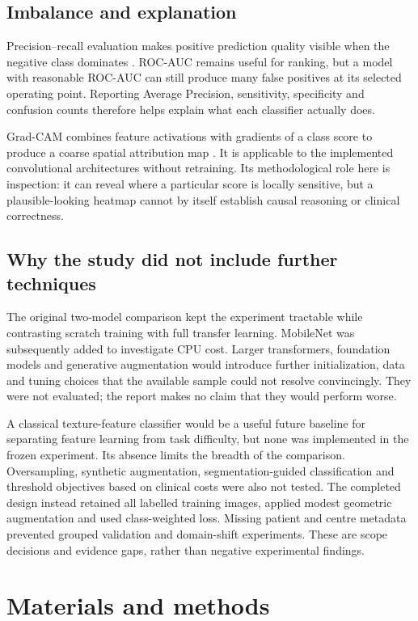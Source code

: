 \documentclass[11pt,a4paper]{article}
\begin{document}
\subsection{Imbalance and explanation}
Precision--recall evaluation makes positive prediction quality visible when the negative class dominates \citep{saito2015}. ROC-AUC remains useful for ranking, but a model with reasonable ROC-AUC can still produce many false positives at its selected operating point. Reporting Average Precision, sensitivity, specificity and confusion counts therefore helps explain what each classifier actually does.

Grad-CAM combines feature activations with gradients of a class score to produce a coarse spatial attribution map \citep{selvaraju2017}. It is applicable to the implemented convolutional architectures without retraining. Its methodological role here is inspection: it can reveal where a particular score is locally sensitive, but a plausible-looking heatmap cannot by itself establish causal reasoning or clinical correctness.

\subsection{Why the study did not include further techniques}
The original two-model comparison kept the experiment tractable while contrasting scratch training with full transfer learning. MobileNet was subsequently added to investigate CPU cost. Larger transformers, foundation models and generative augmentation would introduce further initialization, data and tuning choices that the available sample could not resolve convincingly. They were not evaluated; the report makes no claim that they would perform worse.

A classical texture-feature classifier would be a useful future baseline for separating feature learning from task difficulty, but none was implemented in the frozen experiment. Its absence limits the breadth of the comparison. Oversampling, synthetic augmentation, segmentation-guided classification and threshold objectives based on clinical costs were also not tested. The completed design instead retained all labelled training images, applied modest geometric augmentation and used class-weighted loss. Missing patient and centre metadata prevented grouped validation and domain-shift experiments. These are scope decisions and evidence gaps, rather than negative experimental findings.

\section{Materials and methods}
\end{document}
